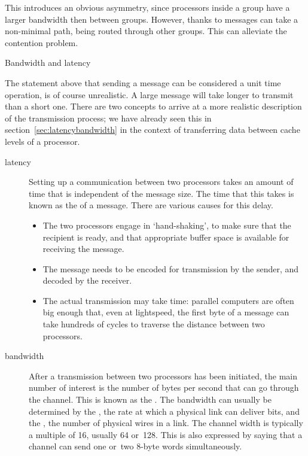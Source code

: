 This introduces an obvious asymmetry, since processors inside a group
have a larger bandwidth then between groups. However, thanks to
 messages can take a non-minimal path,
being routed through other groups. This can alleviate the contention problem.

 {Bandwidth and latency}
\label{sec:bwlatency}

The statement above that sending a message can be considered a unit
time operation, is of course unrealistic. A large message will take
longer to transmit than a short one. There are two concepts to arrive
at a more realistic description of the transmission process; we have
already seen this in section~\ref{sec:latencybandwidth} in the context
of transferring data between cache levels of a processor.
\begin{description}
\item[latency] Setting up a communication between two processors takes
  an amount of time that is independent of the message size. The time
  that this takes is known as the  of a message.
  There are various causes for this delay.
  \begin{itemize}
  \item The two processors engage in `hand-shaking', to make sure that
    the recipient is ready, and that appropriate buffer space is
    available for receiving the message.
  \item The message needs to be encoded for transmission by the sender,
    and decoded by the receiver.
  \item The actual transmission may take time: parallel computers are
    often big enough that, even at lightspeed, the first byte of a
    message can take hundreds of cycles to traverse the distance
    between two processors.
  \end{itemize}
\item[bandwidth] After a transmission between two processors has been
  initiated, the main number of interest is the number of bytes per
  second that can go through the channel. This is known as the
  . The bandwidth can usually be determined by
  the , the rate at which a physical link can
  deliver bits, and the , the number of
  physical wires in a link. The channel width is typically a multiple
  of 16, usually 64 or~128. This is also expressed by saying that a
  channel can send one or~two 8-byte words simultaneously.
\end{description}

